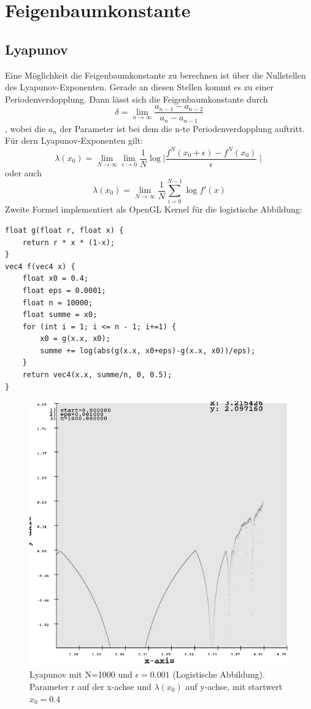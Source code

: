 \documentclass{scrartcl}
\begin{document}
\section{ Feigenbaumkonstante}
\subsection {Lyapunov}
Eine Möglichkeit die Feigenbaumkonstante zu berechnen ist über die Nullstellen des Lyapunov-Exponenten. Gerade an diesen Stellen kommt es zu einer Periodenverdopplung. Dann lässt sich die Feigenbaumkonstante durch
$$\delta = \lim_{n \rightarrow \infty}\frac{a_{n-1}-a_{n-2}}{a_n-a_{n-1}}$$
, wobei die $a_n$ der Parameter ist bei dem die n-te Periodenverdopplung auftritt.
\newline
Für dern Lyapunov-Exponenten gilt:
$$\lambda(x_0) = \lim_{N \rightarrow \infty}\lim_{\epsilon \rightarrow 0} \frac{1}{N}\log{\mid \frac{f^N(x_0+\epsilon)- f^N(x_0)}{\epsilon} \mid} $$
oder auch
$$\lambda(x_0) = \lim_{N \rightarrow \infty} \frac{1}{N} \sum_{i=0}^{N-1}  \log{f'(x)} $$
Zweite Formel implementiert als OpenGL Kernel für die logistische Abbildung:
\begin{lstlisting}
float g(float r, float x) {
    return r * x * (1-x);
}
vec4 f(vec4 x) {
    float x0 = 0.4;
    float eps = 0.0001;
    float n = 10000;
    float summe = x0;
    for (int i = 1; i <= n - 1; i+=1) {
        x0 = g(x.x, x0);
        summe += log(abs(g(x.x, x0+eps)-g(x.x, x0))/eps);
    }
    return vec4(x.x, summe/n, 0, 0.5);
}
\end{lstlisting}
\begin{figure}
	\centering
	\includegraphics[scale=0.65]{lyapunov_1000}
	\caption{Lyapunov mit N=1000 und $\epsilon=0.001$ (Logistische Abbildung). Parameter r auf der x-achse und $\lambda(x_0)$ auf y-achse, mit startwert $x_0=0.4$}
	\label{img:lyapunov_100}
\end{figure}
\end{document}
